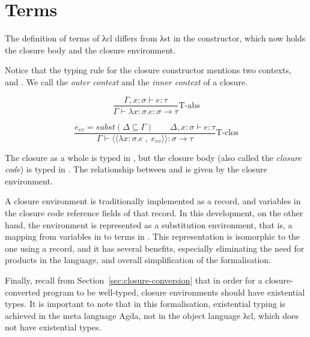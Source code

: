 \documentclass[bsc,frontabs,oneside,singlespacing,parskip,deptreport]{infthesis}
\theoremstyle{definition}
\theoremstyle{lemma}
\begin{document}
\section{Terms}
\label{sec:closure-language-cl-1}

The definition of terms of λcl differs from λst in the 
constructor, which now holds the closure body and the closure
environment.


Notice that the typing rule for the closure constructor 
mentions two contexts,  and . We call  the
\textit{outer context} and  the \textit{inner context} of a
closure.

\begin{minipage}{.5\textwidth}
  \[
  \frac
  {\Gamma , x : \sigma \vdash e : \tau}
  {\Gamma \vdash \lambda x : \sigma . e : \sigma \rightarrow \tau}
  \text{T-abs}
  \]
\end{minipage}%
\begin{minipage}{.5\textwidth}
  \[
  \frac
  {e_{ev} = subst ( \Delta \subseteq \Gamma ) \quad \quad \Delta , x : \sigma \vdash e : \tau}
  {\Gamma \vdash \langle\langle \lambda x : \sigma . e \; , \; e_{ev} \rangle\rangle : \sigma \rightarrow \tau}
  \text{T-clos}
  \]
\end{minipage}

The closure as a whole is typed in , but the closure body (also
called the \textit{closure code}) is typed in . The
relationship between  and  is given by the closure
environment.

A closure environment is traditionally implemented as a record, and
variables in the closure code reference fields of that record. In this
development, on the other hand, the environment is represented as a
substitution environment, that is, a mapping from variables in 
to terms in . This representation is isomorphic to the one using
a record, and it has several benefits, especially eliminating the need
for products in the language, and overall simplification of the
formalisation.

Finally, recall from Section~\ref{sec:closure-conversion} that in
order for a closure-converted program to be well-typed, closure
environments should have existential types. It is important to note
that in this formalisation, existential typing is achieved in the meta
language Agda, not in the object language λcl, which does not have
existential types.
\end{document}
